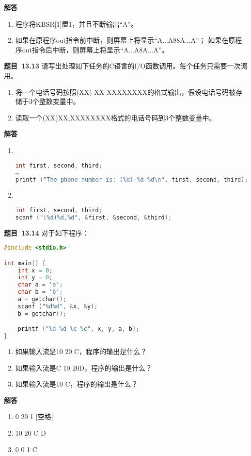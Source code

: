 \documentclass[10pt,a4paper,UTF8]{ctexart}
\newcommand{\problemname}{待定义}
\newenvironment{problem}{\begin{shaded}\par\noindent\textbf{题目\  \problemname}}{\end{shaded}\par}
\newenvironment{solution}{\par\noindent\textbf{解答}\ }{\par}
\begin{document}
\begin{solution}
	\begin{enumerate}[(1)]
		\item 程序将KBSR[1]置1，并且不断输出“A”。
		\item 如果在原程序out指令前中断，则屏幕上将显示“A...A88A...A”；
				如果在原程序out指令后中断，则屏幕上将显示“A...A8A...A”。
	\end{enumerate}

\end{solution}


\renewcommand{\problemname}{13.13}
\begin{problem}
	请写出处理如下任务的C语言的I/O函数调用。每个任务只需要一次调用。
	\begin{enumerate}[(1)]
		\item 将一个电话号码按照(XX)-XX-XXXXXXXX的格式输出，假设电话号码被存储于3个整数变量中。
		\item 读取一个(XX)XX,XXXXXXXX格式的电话号码到3个整数变量中。
	\end{enumerate}
\end{problem}

\begin{solution}
	\begin{enumerate}[(1)]
		\item \ 
		\begin{lstlisting}[language=C]
int first, second, third;
…
printf ("The phone number is: (%d)-%d-%d\n", first, second, third);
		\end{lstlisting}
		\item \ 
		\begin{lstlisting}[language=C]
int first, second, third;
scanf ("(%d)%d,%d", &first, &second, &third);
		\end{lstlisting}

	\end{enumerate}

\end{solution}


\renewcommand{\problemname}{13.14}
\begin{problem}
	对于如下程序：
	\begin{lstlisting}[language=C]
#include <stdio.h> 

int main() { 
	int x = 0; 
	int y = 0; 
	char a = 'a'; 
	char b = 'b';
	a = getchar(); 
	scanf ("%d%d", &x, &y); 
	b = getchar(); 

	printf ("%d %d %c %c", x, y, a, b); 
} 

	\end{lstlisting}
	\begin{enumerate}[(1)]
		\item 如果输入流是10 20 C，程序的输出是什么？
		\item 如果输入流是C 10 20D，程序的输出是什么？
		\item 如果输入流是10 C，程序的输出是什么？
	\end{enumerate}
\end{problem}

\begin{solution}
	\begin{enumerate}[(1)]
		\item 0 20 1 [空格]
		\item 10 20 C D
		\item 0 0 1 C
	\end{enumerate}
\end{solution}
\end{document}
